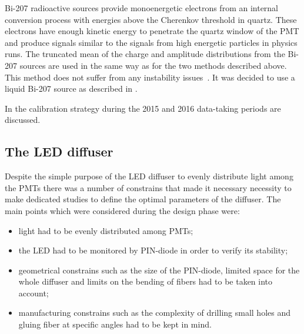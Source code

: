 Bi-207 radioactive sources provide monoenergetic electrons from an internal conversion process with energies 
above the Cherenkov threshold in quartz. These electrons
have enough kinetic energy to penetrate the quartz window of the PMT and produce signals similar to the signals 
from high energetic particles in physics runs. The truncated mean of the charge and amplitude 
distributions from the Bi-207 sources are used in the same way as for the two methods described above. 
This method does not suffer from any instability issues~\cite{Alberghi:2016tad}.
It was decided to use a liquid Bi-207 source as described in .

In  the calibration strategy during the  2015 and 2016 data-taking periods are discussed.

\subsection{The LED diffuser}
\label{subsec:LEDDiffuser}



Despite the simple purpose of the LED diffuser to evenly distribute light among the PMTs 
there was a number of constrains that made it necessary necessity to make dedicated studies 
to define the optimal parameters of the diffuser. The main points which were considered during the design phase were:
\begin{itemize}
 \item light had to be evenly distributed among PMTs;
 \item the LED had to be monitored by PIN-diode in order to verify its stability;
 \item geometrical constrains such as the size of the PIN-diode, 
       limited space for the whole diffuser and limits on the bending of fibers had to be taken into account;
 \item manufacturing constrains such as the complexity of drilling small holes and gluing fiber at specific angles had to be kept in mind.
\end{itemize}

